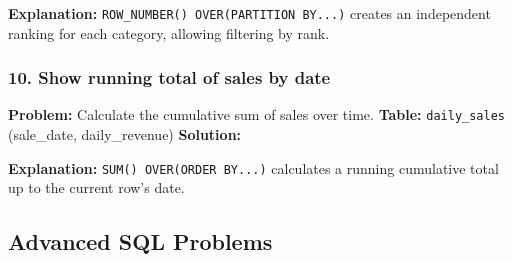 \begin{Shaded}
\begin{Highlighting}[]
\NormalTok{ (}
        \NormalTok{() }\NormalTok{(}  \NormalTok{) }
\NormalTok{)}
 \OperatorTok{*} \OperatorTok{\textless{}=} \NormalTok{;}
\end{Highlighting}
\end{Shaded}

\textbf{Explanation:} \texttt{ROW\_NUMBER()\ OVER(PARTITION\ BY...)}
creates an independent ranking for each category, allowing filtering by
rank.

\subsubsection{10. Show running total of sales by
date}\label{show-running-total-of-sales-by-date}

\textbf{Problem:} Calculate the cumulative sum of sales over time.
\textbf{Table:} \texttt{daily\_sales} (sale\_date, daily\_revenue)
\textbf{Solution:}

\begin{Shaded}
\begin{Highlighting}[]
    \NormalTok{ (} 
\end{Highlighting}
\end{Shaded}

\textbf{Explanation:} \texttt{SUM()\ OVER(ORDER\ BY...)} calculates a
running cumulative total up to the current row's date.

\subsection{Advanced SQL Problems}\label{advanced-sql-problems}


